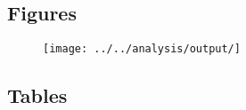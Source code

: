 
\subsection{Figures}

\begin{figure}[H]
\caption{}
\centering
\texttt{[image: ../../analysis/output/]}
\label{fig:}
\end{figure}


\newpage
\subsection{Tables}

\begin{table}[H]
\caption{}
\centering
\begin{threeparttable}

\end{threeparttable}
\label{tab:}
\end{table}
